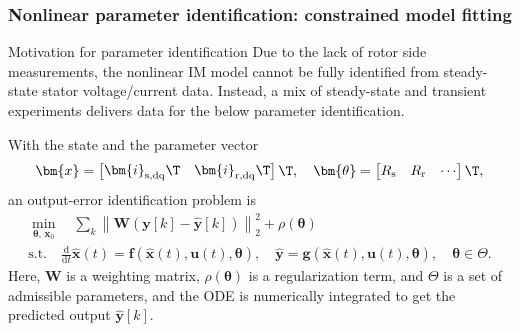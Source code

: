 \begin{frame}
    \frametitle{Nonlinear parameter identification: constrained model fitting}
    \begin{varblock}{Motivation for parameter identification}
        Due to the lack of  rotor side measurements, the nonlinear IM model cannot be fully identified from steady-state stator voltage/current data. Instead, a mix of steady-state and transient experiments delivers data for the below parameter identification.
    \end{varblock}\pause%
    With the state and the parameter vector
    \begin{equation}
        \bm{x}=\begin{bmatrix}\bm{i}_\mathrm{s,dq}\T&\bm{i}_\mathrm{r,dq}\T\end{bmatrix}\T,
        \quad
        \bm{\theta}=\begin{bmatrix}R_\mathrm{s}&R_\mathrm{r}&\cdots\end{bmatrix}\T,
    \end{equation}\pause%
    an output-error identification problem is
    \begin{equation}
        \begin{gathered}
            \min_{\bm{\theta}, \,\bm{x}_{0}}\quad
            \sum_k
            \left\|\bm{W}\left(\bm{y}[k]-\hat{\bm{y}}[k]\right)\right\|_2^2
            +\rho(\bm{\theta}) \\
            \mathrm{s.t.}\quad
            \frac{\mathrm{d}}{\mathrm{d}t}\hat{\bm{x}}(t)=\bm{f}(\hat{\bm{x}}(t),\bm{u}(t),\bm{\theta}), \quad \hat{\bm{y}}=\bm{g}(\hat{\bm{x}}(t),\bm{u}(t),\bm{\theta}),\quad \bm{\theta}\in\Theta.
            \label{eq:IM_parameter_identification_general}
        \end{gathered}
    \end{equation}\pause%
    Here, $\bm{W}$ is a weighting matrix, $\rho(\bm{\theta})$ is a regularization term, and $\Theta$ is a set of admissible parameters, and the ODE is numerically integrated to get the predicted output $\hat{\bm{y}}[k]$.
\end{frame}



